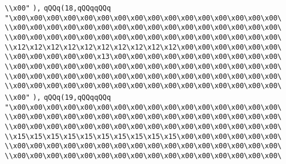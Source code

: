 \verb|\\x00"|\newline
\verb|),|\newline
\verb|qQQq(18,qQQqqQQq|\newline
\verb|"\x00\x00\x00\x00\x00\x00\x00\x00\x00\x00\x00\x00\x00\x00\x00\x00\|\newline
\verb|\\x00\x00\x00\x00\x00\x00\x00\x00\x00\x00\x00\x00\x00\x00\x00\x00\|\newline
\verb|\\x00\x00\x00\x00\x00\x00\x00\x00\x00\x00\x00\x00\x00\x00\x00\x00\|\newline
\verb|\\x12\x12\x12\x12\x12\x12\x12\x12\x12\x12\x00\x00\x00\x00\x00\x00\|\newline
\verb|\\x00\x00\x00\x00\x00\x13\x00\x00\x00\x00\x00\x00\x00\x00\x00\x00\|\newline
\verb|\\x00\x00\x00\x00\x00\x00\x00\x00\x00\x00\x00\x00\x00\x00\x00\x00\|\newline
\verb|\\x00\x00\x00\x00\x00\x00\x00\x00\x00\x00\x00\x00\x00\x00\x00\x00\|\newline
\verb|\\x00\x00\x00\x00\x00\x00\x00\x00\x00\x00\x00\x00\x00\x00\x00\x00\|\newline
\verb|\\x00"|\newline
\verb|),|\newline
\verb|qQQq(19,qQQqqQQq|\newline
\verb|"\x00\x00\x00\x00\x00\x00\x00\x00\x00\x00\x00\x00\x00\x00\x00\x00\|\newline
\verb|\\x00\x00\x00\x00\x00\x00\x00\x00\x00\x00\x00\x00\x00\x00\x00\x00\|\newline
\verb|\\x00\x00\x00\x00\x00\x00\x00\x00\x00\x00\x00\x00\x00\x00\x00\x00\|\newline
\verb|\\x15\x15\x15\x15\x15\x15\x15\x15\x15\x15\x00\x00\x00\x00\x00\x00\|\newline
\verb|\\x00\x00\x00\x00\x00\x00\x00\x00\x00\x00\x00\x00\x00\x00\x00\x00\|\newline
\verb|\\x00\x00\x00\x00\x00\x00\x00\x00\x00\x00\x00\x00\x00\x00\x00\x00\|\newline
